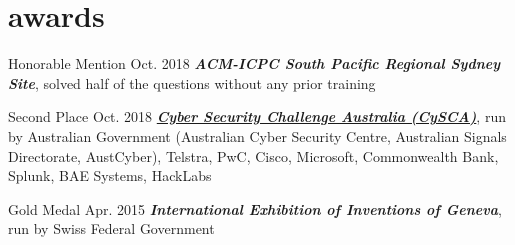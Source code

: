 \documentclass[hidelinks__VERSION__]{adamyi-cv}
\begin{document}


\section{awards}

\begin{entrylist}


\entry
{Honorable Mention}
{Oct. 2018}
{\emph{\textbf{ACM-ICPC South Pacific Regional Sydney Site}}, solved half of the questions without any prior training
}


\entry
{Second Place}
{Oct. 2018}
{\emph{\textbf{\href{https://www.cyberchallenge.com.au/}{Cyber Security Challenge Australia (CySCA)}}}, run by Australian Government (Australian Cyber Security Centre, Australian Signals Directorate, AustCyber), Telstra, PwC, Cisco, Microsoft, Commonwealth Bank, Splunk, BAE Systems, HackLabs
}


\entry
{Gold Medal}
{Apr. 2015}
{\emph{\textbf{International Exhibition of Inventions of Geneva}}, run by Swiss Federal Government
}


\end{entrylist}

\end{document}

